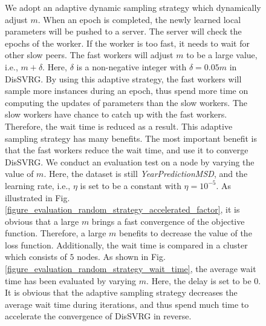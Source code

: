 \documentclass[preprint,review,11pt,a4paper]{elsarticle}
\begin{document}
\begin{figure}
We adopt an adaptive dynamic sampling strategy which dynamically adjust $m$. When an epoch is completed, the newly learned local parameters will be pushed to a server. The server will check the epochs of the worker. If the worker is too fast, it needs to wait for other slow peers.  The fast workers will adjust  $m$ to be a large value, i.e., $m+\delta$. Here, $\delta$ is a non-negative integer with $\delta=0.05m$ in DisSVRG. By using this adaptive strategy, the fast workers will sample more instances during an epoch, thus spend more time on computing the updates of parameters than the slow workers. The slow workers have chance to catch up with the fast workers. Therefore, the wait time is reduced as a result. This adaptive sampling strategy has many benefits. The most important benefit is that the fast workers reduce the wait time, and use it  to converge DisSVRG. We conduct an evaluation test on a  node by varying the value of $m$. Here, the dataset is still \emph{YearPredictionMSD}, and the learning rate, i.e., $\eta$ is set to be a constant with $\eta=10^{-5}$. As illustrated in Fig. \ref{figure_evaluation_random_strategy_accelerated_factor},  it is obvious that a large $m$ brings a fast convergence of the objective function. Therefore, a large $m$ benefits to decrease the value of the loss function. Additionally, the wait time is compared in a cluster which consists of $5$ nodes.   As shown in Fig. \ref{figure_evaluation_random_strategy_wait_time}, the average wait time has been evaluated by varying $m$. Here, the delay is set to be $0$.  It is obvious that the adaptive sampling strategy  decreases the average wait time during iterations, and thus spend much time to accelerate the convergence of DisSVRG in reverse.


\end{figure}
\end{document}
